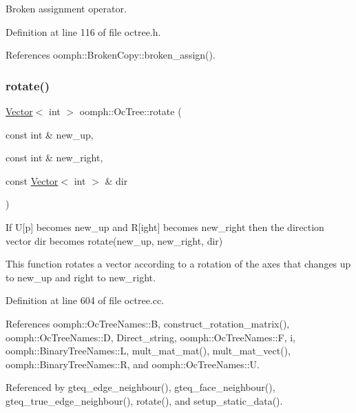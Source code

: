 Broken assignment operator. 



Definition at line 116 of file octree.\+h.



References oomph\+::\+Broken\+Copy\+::broken\+\_\+assign().

\mbox{\label{classoomph_1_1OcTree_a25e5185f0395a19883e216fd80103cf7}} 
\subsubsection{\texorpdfstring{rotate()}{rotate()}\hspace{0.1cm}{\footnotesize\ttfamily [1/2]}}
{\footnotesize\ttfamily \hyperlink{classoomph_1_1Vector}{Vector}$<$ int $>$ oomph\+::\+Oc\+Tree\+::rotate (\begin{DoxyParamCaption}\item[{const int \&}]{new\+\_\+up,  }\item[{const int \&}]{new\+\_\+right,  }\item[{const \hyperlink{classoomph_1_1Vector}{Vector}$<$ int $>$ \&}]{dir }\end{DoxyParamCaption})\hspace{0.3cm}{\ttfamily [static]}}



If U\mbox{[}p\mbox{]} becomes new\+\_\+up and R\mbox{[}ight\mbox{]} becomes new\+\_\+right then the direction vector {\ttfamily dir} becomes rotate(new\+\_\+up, new\+\_\+right, dir) 

This function rotates a vector according to a rotation of the axes that changes up to new\+\_\+up and right to new\+\_\+right. 

Definition at line 604 of file octree.\+cc.



References oomph\+::\+Oc\+Tree\+Names\+::B, construct\+\_\+rotation\+\_\+matrix(), oomph\+::\+Oc\+Tree\+Names\+::D, Direct\+\_\+string, oomph\+::\+Oc\+Tree\+Names\+::F, i, oomph\+::\+Binary\+Tree\+Names\+::L, mult\+\_\+mat\+\_\+mat(), mult\+\_\+mat\+\_\+vect(), oomph\+::\+Binary\+Tree\+Names\+::R, and oomph\+::\+Oc\+Tree\+Names\+::U.



Referenced by gteq\+\_\+edge\+\_\+neighbour(), gteq\+\_\+face\+\_\+neighbour(), gteq\+\_\+true\+\_\+edge\+\_\+neighbour(), rotate(), and setup\+\_\+static\+\_\+data().

